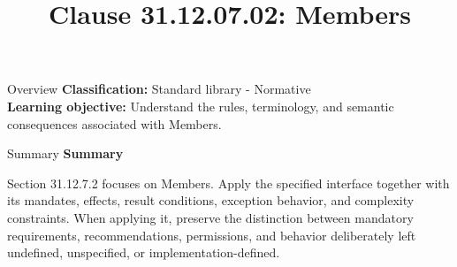 \documentclass[10pt,letterpaper]{article}
\title{Clause 31.12.07.02: Members}
\author{}
\date{}
\begin{document}
\maketitle
\begin{CornellOverviewBox}{Overview}
\textbf{Classification:} Standard library - Normative\\[2pt]
\textbf{Learning objective:} Understand the rules, terminology, and semantic consequences associated with Members.
\end{CornellOverviewBox}\begin{CornellSummaryBox}{Summary}
{\sffamily\bfseries\color{Accent} Summary}\par\vspace{3pt}Section 31.12.7.2 focuses on Members. Apply the specified interface together with its mandates, effects, result conditions, exception behavior, and complexity constraints. When applying it, preserve the distinction between mandatory requirements, recommendations, permissions, and behavior deliberately left undefined, unspecified, or implementation-defined.
\end{CornellSummaryBox}
\end{document}
